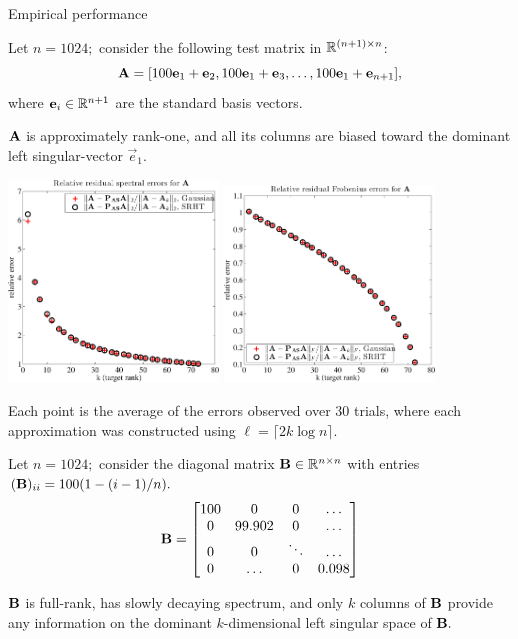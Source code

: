 \documentclass[xcolor=x11names,compress,ignorenonframetext]{beamer}
\renewcommand{\(}{\begin{columns}}
\renewcommand{\)}{\end{columns}}
\newcommand{\<}[1]{\begin{column}{#1}}
\renewcommand{\>}{\end{column}}
\begin{document}
\begin{frame}{Empirical performance}
 
 Let $n = 1024;$ consider the following test matrix in $\mathbb{R}^{(n+1)\times n}$:
\[ \mathbf{A} = [100 \mathbf{e}_1 + \mathbf{e}_2, 100 \mathbf{e}_1
 + \mathbf{e}_3, \ldots, 100 \mathbf{e}_1 + \mathbf{e}_{n+1}], \]
where $\mathbf{e}_i \in \mathbb{R}^{n+1}$ are the standard basis vectors.

\vspace{1em}
$\mathbf{A}$ is approximately rank-one, and all its columns are biased toward the dominant left singular-vector $\vec{e}_1.$
\end{frame}

\begin{frame}
 \centerline{%
 \includegraphics[width=2.2in, keepaspectratio=true]{experimentA-residual-spectral.pdf}%
 \includegraphics[width=2.2in, keepaspectratio=true]{experimentA-residual-frobenius.pdf}}
 \vspace{1em}
  Each point is the average of the errors observed over 30 trials,
 where each approximation was constructed using $\ell = \lceil 2 k \log n \rceil.$
 
\end{frame}

\begin{frame}

 Let $n = 1024;$ consider the diagonal matrix $\mathbf{B} \in \mathbb{R}^{n \times n}$ with 
 entries $(\mathbf{B})_{ii} = 100(1 - (i-1)/n).$
 \[
  \mathbf{B} = \left[ 
          \begin{matrix} 100 &  0     & 0 & \ldots \\
                          0  & 99.902 & 0 & \ldots \\
                          0  & 0      & \ddots & \ldots \\
                          0  & \ldots & 0 & 0.098 
          \end{matrix}
          \right]
 \]

  $\mathbf{B}$ is full-rank, has slowly decaying spectrum, and only $k$ columns of $\mathbf{B}$
  provide any information on the dominant $k$-dimensional left singular space of $\mathbf{B}.$
\end{frame}
 
\end{document}
